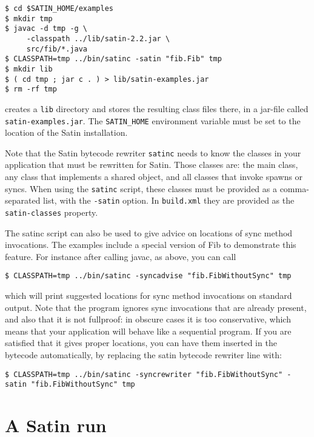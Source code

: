 \documentclass[a4paper,10pt]{article}
\begin{document}
\begin{verbatim}
$ cd $SATIN_HOME/examples
$ mkdir tmp
$ javac -d tmp -g \
     -classpath ../lib/satin-2.2.jar \
     src/fib/*.java
$ CLASSPATH=tmp ../bin/satinc -satin "fib.Fib" tmp
$ mkdir lib
$ ( cd tmp ; jar c . ) > lib/satin-examples.jar
$ rm -rf tmp
\end{verbatim}

creates a \texttt{lib} directory and stores the resulting class files there,
in a jar-file called \texttt{satin-examples.jar}.
The \texttt{SATIN\_HOME} environment variable must be set to the location of
the Satin installation.

Note that the Satin bytecode rewriter \texttt{satinc} needs to know the
classes in your application that must be rewritten for Satin.
Those classes are: the main class, any class that implements a shared object,
and all classes that invoke spawns or syncs.
When using the \texttt{satinc} script, these classes must be provided as
a comma-separated list, with the \texttt{-satin} option. In
\texttt{build.xml} they are provided as the \texttt{satin-classes} property.

The satinc script can also be used to give advice on locations of sync method
invocations. The examples include a special version of Fib to demonstrate this
feature. For instance after calling javac, as above, you can call

\begin{verbatim}
$ CLASSPATH=tmp ../bin/satinc -syncadvise "fib.FibWithoutSync" tmp
\end{verbatim}

which will print suggested locations for sync method invocations on standard
output. Note that the program ignores sync invocations that are already present,
and also that it is not fullproof: in obscure cases it is too conservative,
which means that your application will behave like a sequential program.
If you are satisfied that it gives proper
locations, you can have them inserted in the bytecode automatically, by replacing
the satin bytecode rewriter line with:

\begin{verbatim}
$ CLASSPATH=tmp ../bin/satinc -syncrewriter "fib.FibWithoutSync" -satin "fib.FibWithoutSync" tmp
\end{verbatim}

\section{A Satin run}
\end{document}
